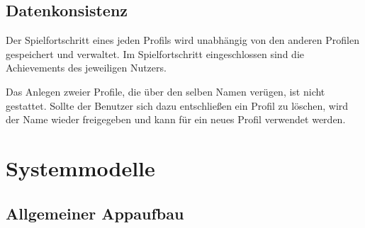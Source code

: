 \documentclass{scrartcl}
\begin{document}
\subsection{Datenkonsistenz}

\begin{telist}[resume]
	\item Der Spielfortschritt eines jeden Profils wird unabhängig von den anderen Profilen gespeichert und verwaltet. Im Spielfortschritt eingeschlossen sind die Achievements des jeweiligen Nutzers.
	\item Das Anlegen zweier Profile, die über den selben Namen verügen, ist nicht gestattet. Sollte der Benutzer sich dazu entschließen ein Profil zu löschen, wird der Name wieder freigegeben und kann für ein neues Profil verwendet werden.
\end{telist}

\clearpage











\section{Systemmodelle}

\subsection{Allgemeiner Appaufbau}
\end{document}
